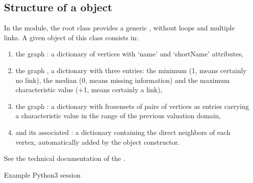 \documentclass[a4paper,12pt,english]{sphinxhowto}
\begin{document}
\subsection{Structure of a  object}
\label{\detokenize{tutorial:structure-of-a-graph-object}}
In the  module, the root  class provides a generic , without loops and multiple links. A given object of this class consists in:
\begin{enumerate}
%
\item {} 
the graph  : a dictionary of vertices with ‘name’ and ‘shortName’ attributes,

\item {} 
the graph  , a dictionary with three entries: the minimum (\sphinxhyphen{}1, means certainly no link), the median (0, means missing information) and the maximum characteristic value (+1, means certainly a link),

\item {} 
the graph  : a dictionary with frozensets of pairs of vertices as entries carrying a characteristic value in the range of the previous valuation domain,

\item {} 
and its associated  : a dictionary containing the direct neighbors of each vertex, automatically added by the object constructor.

\end{enumerate}

See the technical documentation of the .

Example Python3 session

\begin{sphinxVerbatim}[commandchars=\\\{\},numbers=left,firstnumber=1,stepnumber=1]
   
  
\end{sphinxVerbatim}
\end{document}
